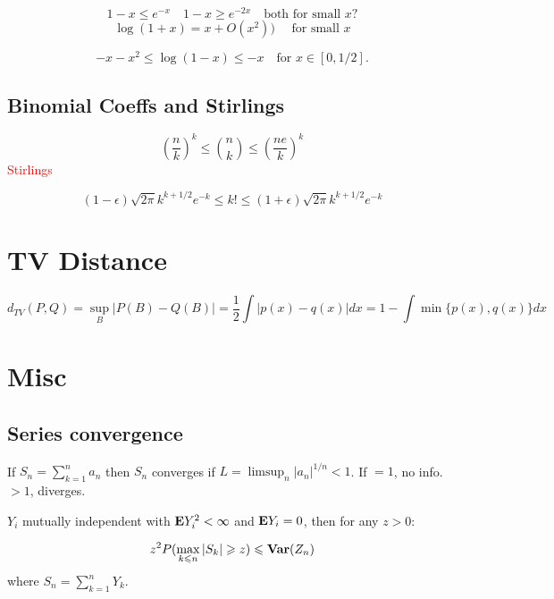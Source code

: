 \documentclass{article}
\newcommand\myworries[1]{\textcolor{red}{#1}}
\begin{document}
$$1-x \leq e^{-x} \quad 1-x\geq e^{-2x} \quad \text{both for small } x?$$  
$$\log(1+x) = x + O(x^2)) \quad \text{ for small } x$$

$$-x-x^2 \leq \log(1-x) \leq -x \quad \text{for } x\in [0,1/2].$$



\subsection{Binomial Coeffs and Stirlings}
$$(\frac{n}{k})^k \leq \binom{n}{k} \leq (\frac{ne}{k})^k $$
\myworries{Stirlings}
\begin{theorem}[Stirlings]
$$(1-\epsilon) \sqrt{2\pi} k^{k+1/2}e^{-k}\leq k! \leq (1+\epsilon) \sqrt{2\pi} k^{k+1/2}e^{-k}$$
\end{theorem}


\section{TV Distance}

$$d_{TV} (P, Q) = \sup_B |P(B) - Q(B)| = \frac{1}{2} \int |p(x) - q(x)| dx = 1- \int \min\{ p(x), q(x)\} dx $$ 

\section{Misc}
\begin{definition}[Metric]
\end{definition}

\subsection{Series convergence}
\begin{theorem}
If $S_n = \sum_{k=1}^n a_n$ then $S_n$ converges if $L = \limsup_n |a_n|^{1/n} <1$. If $=1$, no info. $>1$, diverges. 
\end{theorem}


\begin{theorem}
$Y_i$ mutually independent with $\mathbf{E} Y_i^2 <\infty$ and $\mathbf{E} Y_i = 0$, then for any $z>0$:

$$z^2 P(\max_{k\leqslant n} |S_k| \geqslant z) \leqslant \mathbf{Var} (Z_n)$$
where $S_n = \sum_{k=1}^n Y_k$.
\end{theorem}
\newpage
\end{document}
